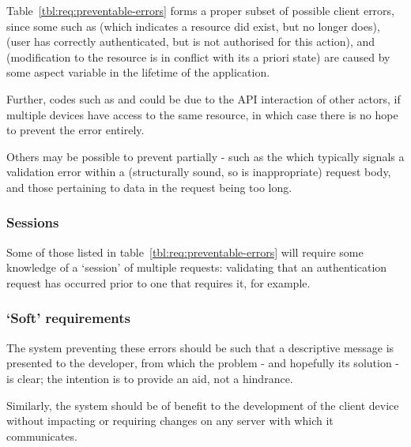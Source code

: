 Table~\ref{tbl:req:preventable-errors} forms a proper subset of possible client errors, since some such as  (which indicates a resource did exist, but no longer does),  (user has correctly authenticated, but is not authorised for this action), and  (modification to the resource is in conflict with its a priori state) are caused by some aspect variable in the lifetime of the application.

Further, codes such as  and  could be due to the API interaction of other actors, if multiple devices have access to the same resource, in which case there is no hope to prevent the error entirely.

Others may be possible to prevent partially - such as the  which typically signals a validation error within a (structurally sound, so  is inappropriate) request body, and those pertaining to data in the request being too long.

\subsubsection{Sessions}\label{intro:req:sessions}
Some of those listed in table~\ref{tbl:req:preventable-errors} will require some knowledge of a `session' of multiple requests: validating that an authentication request has occurred prior to one that requires it, for example.

\subsubsection{`Soft' requirements}\label{intro:req:soft}
The system preventing these errors should be such that a descriptive message is presented to the developer, from which the problem - and hopefully its solution - is clear; the intention is to provide an aid, not a hindrance.

Similarly, the system should be of benefit to the development of the client device without impacting or requiring changes on any server with which it communicates.
